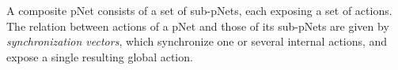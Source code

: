 \documentclass[smallcondensed]{svjour3}
\newcommand{\noteSB}[2][color=green!40, size=\tiny]{\todo[#1]{{\bf
      Note: } {#2}}}
\newcommand{\noteEM}[2][color=blue!40, size=\tiny]{\todo[#1]{{\bf Eric: } {#2}}}
\def\AlgA{\mathcal{A}}
\begin{document}
A composite pNet consists of a set of sub-pNets, each exposing
a set of actions. %
The relation between actions of a pNet and those of its sub-pNets
are given by  \emph{synchronization vectors}, which %
synchronize one or several internal actions, and
expose a single resulting global action.





\end{document}
